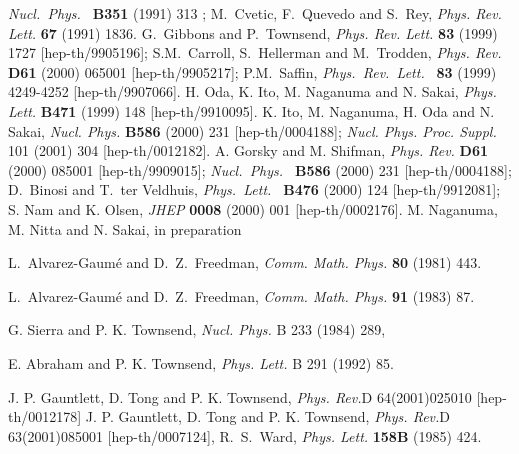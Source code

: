 \documentclass[a4paper,12pt]{article}
\begin{document}
\begin{thebibliography}{100}
             {\it Nucl.\ Phys.\ } {\bf B351} (1991) 313 ;
             M.~Cvetic, F.~Quevedo and S.~Rey,
             {\em Phys. Rev. Lett.} {\bf 67} (1991) 1836.
  G.~Gibbons and P.~Townsend, 
              {\em Phys. Rev. Lett.} {\bf 83} 
              (1999) 1727 [hep-th/9905196]; 
              S.M.~Carroll, S.~Hellerman and M.~Trodden, 
              {\em Phys. Rev.} {\bf D61} (2000) 065001 
              [hep-th/9905217];
              P.M.~Saffin, {\it Phys.\ Rev.\ Lett.\ } {\bf 83} (1999) 
              4249-4252 [hep-th/9907066]. 
H. Oda, K. Ito, M. Naganuma and N. Sakai, 
              {\em Phys. Lett.} {\bf B471} (1999) 148 
              [hep-th/9910095]. 
 K. Ito, M. Naganuma, H. Oda and N. Sakai, 
              {\em Nucl. Phys.} {\bf B586} (2000) 231 
              [hep-th/0004188]; 
             {\em Nucl. Phys. Proc. Suppl.} {101} (2001) 304 
               [hep-th/0012182].
 A. Gorsky and M. Shifman, 
              {\em Phys. Rev.} {\bf D61} 
              (2000) 085001 [hep-th/9909015];
             {\it Nucl.\ Phys.\ } {\bf B586} (2000) 231 
             [hep-th/0004188];
             D.~Binosi and T.~ter Veldhuis, 
             {\it Phys.\ Lett.\ } {\bf B476} (2000) 124 
             [hep-th/9912081];
             S. Nam and K. Olsen, {\em JHEP} {\bf 0008} 
             (2000) 001 [hep-th/0002176].
%
%
  M. Naganuma, M. Nitta and N. Sakai, 
            in preparation

L.~Alvarez-Gaum\'{e} and D.~Z.~Freedman, 
{\em Comm. Math. Phys.} {\bf 80} (1981) 443.

L.~Alvarez-Gaum\'{e} and D.~Z.~Freedman, 
{\em Comm. Math. Phys.} {\bf 91} (1983) 87.

 G. Sierra and P. K. Townsend,
           {\em Nucl. Phys.} {B 233} (1984) 289,
 
E. Abraham and P. K. Townsend, 
{\em Phys. Lett.} {B 291} (1992) 85.
 
J. P. Gauntlett, D. Tong and P. K. Townsend,
              {\em Phys. Rev.}{D 64}(2001)025010
               [hep-th/0012178]
J. P. Gauntlett, D. Tong and P. K. Townsend,
               {\em Phys. Rev.}{D 63}(2001)085001 
               [hep-th/0007124],
R.~S.~Ward, 
{\em Phys. Lett. } {\bf 158B} (1985) 424.


\end{thebibliography}
\end{document}
